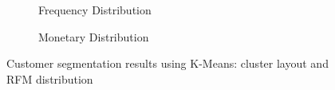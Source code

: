 \begin{figure}[h]
	\vspace{10pt}
	
	\begin{subfigure}[t]{0.48\textwidth}
		\centering
		\caption{Frequency Distribution}
	\end{subfigure}
	\hfill
	\begin{subfigure}[t]{0.48\textwidth}
		\centering
		\caption{Monetary Distribution}
	\end{subfigure}
	
	\caption{Customer segmentation results using K-Means: cluster layout and RFM distribution}
	\label{fig:clustering-subfigures}
\end{figure}


